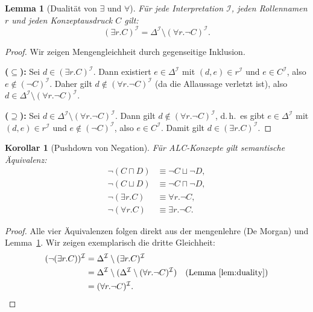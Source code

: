 ﻿\documentclass[a4paper,12pt]{article}
\theoremstyle{definition}
\theoremstyle{plain}
\newtheorem{lemma}{Lemma}[section]
\newtheorem{korollar}{Korollar}[section]
\theoremstyle{remark}
\newcommand{\interp}[1]{\ensuremath{\mathcal{#1}}}
\newcommand{\Dom}[1]{\ensuremath{\Delta^{\interp{#1}}}}
\begin{document}
\begin{lemma}[Dualit{\"{a}}t von $\exists$ und $\forall$]
\label{lem:duality}
F{\"{u}}r jede Interpretation $\interp{I}$, jeden Rollennamen $r$
und jeden Konzeptausdruck $C$ gilt:
\[
  (\exists r.C)^\interp{I} = \Dom{I} \setminus (\forall r.\neg C)^\interp{I}.
\]
\end{lemma}

\begin{proof}
Wir zeigen Mengengleichheit durch gegenseitige Inklusion.

\textbf{($\subseteq$):}
Sei $d \in (\exists r.C)^\interp{I}$.
Dann existiert $e \in \Dom{I}$ mit $(d,e) \in r^\interp{I}$ und
$e \in C^\interp{I}$, also $e \notin (\neg C)^\interp{I}$.
Daher gilt $d \notin (\forall r.\neg C)^\interp{I}$
(da die Allaussage verletzt ist), also
$d \in \Dom{I} \setminus (\forall r.\neg C)^\interp{I}$.

\textbf{($\supseteq$):}
Sei $d \in \Dom{I} \setminus (\forall r.\neg C)^\interp{I}$.
Dann gilt $d \notin (\forall r.\neg C)^\interp{I}$, d.\,h.\
es gibt $e \in \Dom{I}$ mit $(d,e) \in r^\interp{I}$ und
$e \notin (\neg C)^\interp{I}$, also $e \in C^\interp{I}$.
Damit gilt $d \in (\exists r.C)^\interp{I}$. \qedhere
\end{proof}

\begin{korollar}[Pushdown von Negation]
\label{kor:negation}
F{\"{u}}r \textsf{ALC}-Konzepte gilt semantische {\"{A}}quivalenz:
\begin{align*}
  \neg(C \sqcap D) &\equiv \neg C \sqcup \neg D, \\
  \neg(C \sqcup D) &\equiv \neg C \sqcap \neg D, \\
  \neg(\exists r.C) &\equiv \forall r.\neg C, \\
  \neg(\forall r.C) &\equiv \exists r.\neg C.
\end{align*}
\end{korollar}

\begin{proof}
Alle vier {\"{A}}quivalenzen folgen direkt aus der mengenlehre (De Morgan)
und Lemma~\ref{lem:duality}.
Wir zeigen exemplarisch die dritte Gleichheit:
\begin{align*}
  (\neg(\exists r.C))^\interp{I}
  &= \Dom{I} \setminus (\exists r.C)^\interp{I} \\
  &= \Dom{I} \setminus (\Dom{I} \setminus (\forall r.\neg C)^\interp{I})
  \quad \text{(Lemma~\ref{lem:duality})} \\
  &= (\forall r.\neg C)^\interp{I}. \qedhere
\end{align*}
\end{proof}
\end{document}
